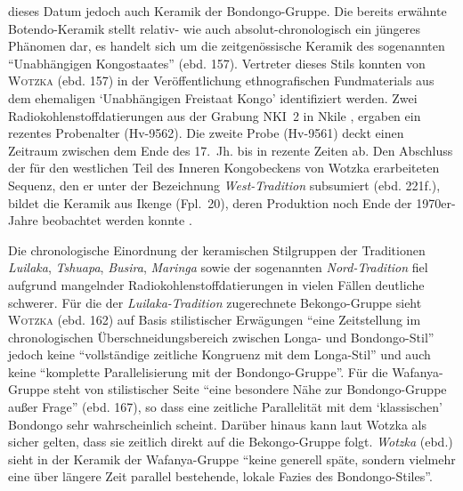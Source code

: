 dieses Datum jedoch auch Keramik der Bondongo-Gruppe. Die bereits erwähnte Botendo-Keramik stellt relativ- wie auch absolut-chronologisch ein jüngeres Phänomen dar, es handelt sich um die zeitgenössische Keramik des sogenannten \enquote{Unabhängigen Kongostaates} (ebd. 157). Vertreter dieses Stils konnten von \textsc{Wotzka} (ebd. 157) in der Veröffentlichung ethnografischen Fundmaterials aus dem ehemaligen \enquote*{Unabhängigen Freistaat Kongo} \parencite[155--157 Taf.~12]{Coart.1907} identifiziert werden. Zwei Radiokohlenstoffdatierungen aus der Grabung NKI~2 in Nkile \parencite[Fpl.~17; ][158 Tab.~70, 318--322 Kat.-Nr.~13; Tab.~\ref{tab:Wotzka1995-412_14C_Repr}]{Wotzka.1995}, ergaben ein rezentes Probenalter (Hv-9562). Die zweite Probe (Hv-9561) deckt einen Zeitraum zwischen dem Ende des 17.~Jh. bis in rezente Zeiten ab. Den Abschluss der für den westlichen Teil des Inneren Kongobeckens von Wotzka erarbeiteten Sequenz, den er unter der Bezeichnung \textit{West-Tradition} subsumiert (ebd. 221f.), bildet die Keramik aus Ikenge (Fpl.~20), deren Produktion noch Ende der 1970er-Jahre beobachtet werden konnte \parencite{Eggert.1980c}. 

Die chronologische Einordnung der keramischen Stilgruppen der Traditionen \textit{Luilaka}, \textit{Tshuapa}, \textit{Busira}, \textit{Maringa} sowie der sogenannten \textit{Nord-Tradition} \parencite[221--224]{Wotzka.1995} fiel aufgrund mangelnder Radiokohlenstoffdatierungen in vielen Fällen deutliche schwerer. Für die der \textit{Luilaka-Tradition} zugerechnete Bekongo-Gruppe sieht \textsc{Wotzka} (ebd. 162) auf Basis stilistischer Erwägungen \enquote{eine Zeitstellung im chronologischen Überschneidungsbereich zwischen Longa- und Bondongo-Stil} jedoch keine \enquote{vollständige zeitliche Kongruenz mit dem Longa-Stil} und auch keine \enquote{komplette Parallelisierung mit der Bondongo-Gruppe}. Für die Wafanya-Gruppe steht von stilistischer Seite \enquote{eine besondere Nähe zur Bondongo-Gruppe außer Frage} (ebd. 167), so dass eine zeitliche Parallelität mit dem \enquote*{klassischen} Bondongo sehr wahrscheinlich scheint. Darüber hinaus kann laut Wotzka als sicher gelten, dass sie zeitlich direkt auf die Bekongo-Gruppe folgt. \textit{Wotzka} (ebd.) sieht in der Keramik der Wafanya-Gruppe \enquote{keine generell späte, sondern vielmehr eine über längere Zeit parallel bestehende, lokale Fazies des Bondongo-Stiles}. 

